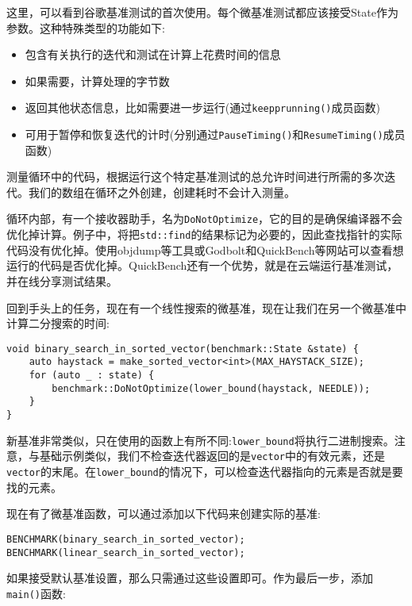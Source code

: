 这里，可以看到谷歌基准测试的首次使用。每个微基准测试都应该接受State作为参数。这种特殊类型的功能如下:

\begin{itemize}
\item 
包含有关执行的迭代和测试在计算上花费时间的信息

\item 
如果需要，计算处理的字节数

\item 
返回其他状态信息，比如需要进一步运行(通过\texttt{keepprunning()}成员函数)

\item 
可用于暂停和恢复迭代的计时(分别通过\texttt{PauseTiming()}和\texttt{ResumeTiming()}成员函数)
\end{itemize}

测量循环中的代码，根据运行这个特定基准测试的总允许时间进行所需的多次迭代。我们的数组在循环之外创建，创建耗时不会计入测量。 

循环内部，有一个接收器助手，名为\texttt{DoNotOptimize}，它的目的是确保编译器不会优化掉计算。例子中，将把\texttt{std::find}的结果标记为必要的，因此查找指针的实际代码没有优化掉。使用objdump等工具或Godbolt和QuickBench等网站可以查看想运行的代码是否优化掉。QuickBench还有一个优势，就是在云端运行基准测试，并在线分享测试结果。

回到手头上的任务，现在有一个线性搜索的微基准，现在让我们在另一个微基准中计算二分搜索的时间:

\begin{lstlisting}[style=styleCXX]
void binary_search_in_sorted_vector(benchmark::State &state) {
	auto haystack = make_sorted_vector<int>(MAX_HAYSTACK_SIZE);
	for (auto _ : state) {
		benchmark::DoNotOptimize(lower_bound(haystack, NEEDLE));
	}
}
\end{lstlisting}

新基准非常类似，只在使用的函数上有所不同:\texttt{lower\_bound}将执行二进制搜索。注意，与基础示例类似，我们不检查迭代器返回的是\texttt{vector}中的有效元素，还是\texttt{vector}的末尾。在\texttt{lower\_bound}的情况下，可以检查迭代器指向的元素是否就是要找的元素。

现在有了微基准函数，可以通过添加以下代码来创建实际的基准:

\begin{lstlisting}[style=styleCXX]
BENCHMARK(binary_search_in_sorted_vector);
BENCHMARK(linear_search_in_sorted_vector);
\end{lstlisting}

如果接受默认基准设置，那么只需通过这些设置即可。作为最后一步，添加\texttt{main()}函数:

